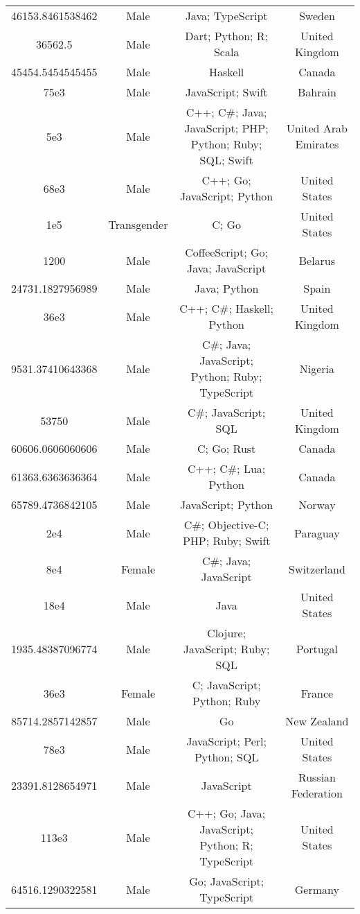 \begin{center}
\begin{tabular}{ |c|c|c|c| }
46153.8461538462  &  Male  &  Java; TypeScript  &  Sweden  \\ 
36562.5  &  Male  &  Dart; Python; R; Scala  &  United Kingdom  \\ 
45454.5454545455  &  Male  &  Haskell  &  Canada  \\ 
75e3  &  Male  &  JavaScript; Swift  &  Bahrain  \\ 
5e3  &  Male  &  C++; C\#; Java; JavaScript; PHP; Python; Ruby; SQL; Swift  &  United Arab Emirates  \\ 
68e3  &  Male  &  C++; Go; JavaScript; Python  &  United States  \\ 
1e5  &  Transgender  &  C; Go  &  United States  \\ 
1200  &  Male  &  CoffeeScript; Go; Java; JavaScript  &  Belarus  \\ 
24731.1827956989  &  Male  &  Java; Python  &  Spain  \\ 
36e3  &  Male  &  C++; C\#; Haskell; Python  &  United Kingdom  \\ 
9531.37410643368  &  Male  &  C\#; Java; JavaScript; Python; Ruby; TypeScript  &  Nigeria  \\ 
53750  &  Male  &  C\#; JavaScript; SQL  &  United Kingdom  \\ 
60606.0606060606  &  Male  &  C; Go; Rust  &  Canada  \\ 
61363.6363636364  &  Male  &  C++; C\#; Lua; Python  &  Canada  \\ 
65789.4736842105  &  Male  &  JavaScript; Python  &  Norway  \\ 
2e4  &  Male  &  C\#; Objective-C; PHP; Ruby; Swift  &  Paraguay  \\ 
8e4  &  Female  &  C\#; Java; JavaScript  &  Switzerland  \\ 
18e4  &  Male  &  Java  &  United States  \\ 
1935.48387096774  &  Male  &  Clojure; JavaScript; Ruby; SQL  &  Portugal  \\ 
36e3  &  Female  &  C; JavaScript; Python; Ruby  &  France  \\ 
85714.2857142857  &  Male  &  Go  &  New Zealand  \\ 
78e3  &  Male  &  JavaScript; Perl; Python; SQL  &  United States  \\ 
23391.8128654971  &  Male  &  JavaScript  &  Russian Federation  \\ 
113e3  &  Male  &  C++; Go; Java; JavaScript; Python; R; TypeScript  &  United States  \\ 
64516.1290322581  &  Male  &  Go; JavaScript; TypeScript  &  Germany  \\ 

\end{tabular}
\end{center}
